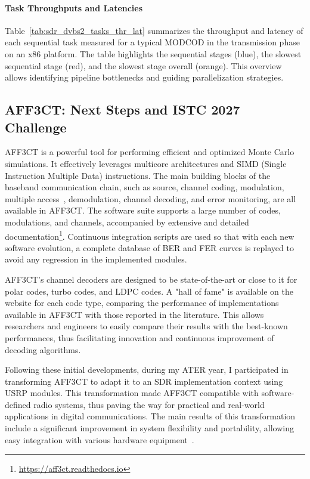 \documentclass[11pt]{report}
\begin{document}
\paragraph{Task Throughputs and Latencies}

Table~\ref{tab:sdr_dvbs2_tasks_thr_lat} summarizes the throughput and latency
of each sequential task measured for a typical MODCOD in the transmission
phase on an x86 platform. The table highlights the sequential stages (blue),
the slowest sequential stage (red), and the slowest stage overall (orange).
This overview allows identifying pipeline bottlenecks and guiding parallelization
strategies.



\subsection{AFF3CT: Next Steps and ISTC 2027 Challenge}



AFF3CT is a powerful tool for performing efficient and optimized Monte Carlo simulations. It effectively leverages multicore architectures and SIMD (Single Instruction Multiple Data) instructions. The main building blocks of the baseband communication chain, such as source, channel coding, modulation, multiple access~\cite{ghaffari:hal-01977885,ghaffari:hal-03762203}, demodulation, channel decoding, and error monitoring, are all available in AFF3CT. The software suite supports a large number of codes, modulations, and channels, accompanied by extensive and detailed documentation\footnote{\url{https://aff3ct.readthedocs.io}}. Continuous integration scripts are used so that with each new software evolution, a complete database of BER and FER curves is replayed to avoid any regression in the implemented modules.

AFF3CT's channel decoders are designed to be state-of-the-art or close to it for polar codes, turbo codes, and LDPC codes. A "hall of fame" is available on the website for each code type, comparing the performance of implementations available in AFF3CT with those reported in the literature. This allows researchers and engineers to easily compare their results with the best-known performances, thus facilitating innovation and continuous improvement of decoding algorithms.

Following these initial developments, during my ATER year, I participated in transforming AFF3CT to adapt it to an SDR implementation context using USRP modules. This transformation made AFF3CT compatible with software-defined radio systems, thus paving the way for practical and real-world applications in digital communications. The main results of this transformation include a significant improvement in system flexibility and portability, allowing easy integration with various hardware equipment~\cite{cassagne:hal-03336450}.
\end{document}
